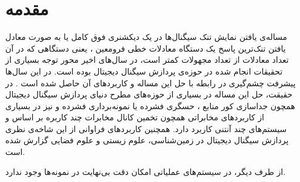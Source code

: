 \newpage 
\chapter{مقدمه}
\label{ch:intro}


مساله‌ی یافتن نمایش تنک
سیگنال‌ها در یک دیکشنری فوق کامل 
یا به صورت معادل یافتن تنک‌ترین پاسخ یک دستگاه معادلات خطی فرومعین
، یعنی دستگاهی که در آن تعداد معادلات از تعداد مجهولات کمتر است، در سال‌های اخیر محور توجه بسیاری از تحقیقات انجام شده در حوزه‌ی پردازش سیگنال دیجیتال بوده است. در این سال‌ها پیشرفت چشم‌گیری در رابطه با حل این مساله و کاربرد‌های آن حاصل شده است
\cite{candes2006robust,donoho2006compressed,donoho2006stable,donoho2006most}. 
در حقیقت، حل این مساله	 در بسیاری از حوزه‌های مطرح دنیای پردازش سیگنال دیجیتال همچون جداسازی کور منابع\cite{gribonval2006survey}
، حسگری فشرده
یا نمونه‌برداری فشرده
\cite{candes2006compressive,donoho2006compressed}
و نیز در بسیاری از کاربرد‌های مخابراتی همچون تخمین کانال
\cite{carbonelli2007sparse}
مخابرات چند کاربره بر اساس 
\cite{aktas2003single,angelosante2010sparsity}
و سیستم‌های چند آنتنی
\cite{dongming2003channel}
کاربرد دارد. همچنین کاربرد‌های فراوانی از این شاخه‌ی نظری پردازش سیگنال دیجیتال در زمین‌شناسی، علوم زیستی و علوم فضایی گزارش شده است.

از طرف دیگر، در سیستم‌های عملیاتی امکان دقت بی‌نهایت در نمونه‌ها وجود ندارد.

